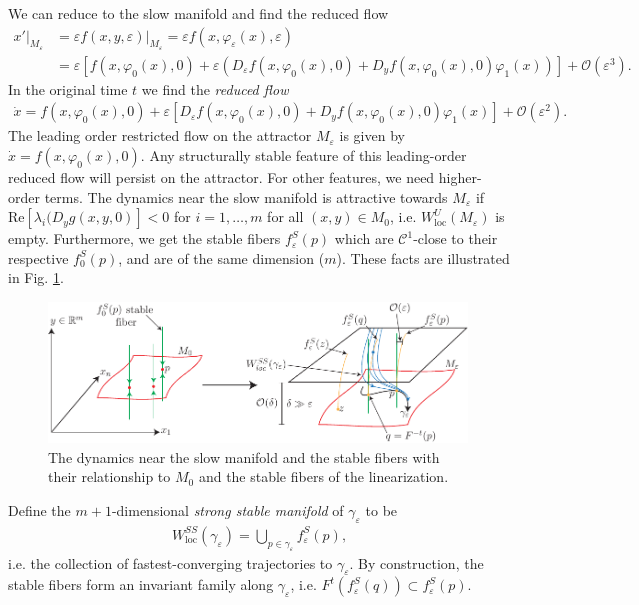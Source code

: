 We can reduce to the slow manifold and find the reduced flow
\begin{align}
	\left. x' \right|_{M_{\varepsilon}} &= \varepsilon\left. f(x,y, \varepsilon)\right|_{M_{\varepsilon }}	= \varepsilon f(x, \varphi_\varepsilon(x), \varepsilon) \\
					    &= \varepsilon \left[ f(x, \varphi_0 (x) , 0) + \varepsilon\left( D_{\varepsilon} f(x, \varphi_0(x), 0) + D_{y}f(x, \varphi_0 (x), 0) \varphi_1(x) \right) \right] + \mathcal{O}(\varepsilon ^{3}).
\end{align}
In the original time $t$ we find the \emph{reduced flow}
\begin{align}
	\boxed{
		\dot{x} = f(x, \varphi_0(x), 0) + \varepsilon \left[ D_{\varepsilon}f(x, \varphi_0(x), 0) + D_{y} f(x, \varphi_0(x), 0) \varphi_1(x) \right] + \mathcal{O}(\varepsilon^{2}).
	}
\end{align}
The leading order restricted flow on the attractor $M_{\varepsilon}$ is given by $\dot{x} = f(x, \varphi_0(x), 0)$. Any structurally stable feature of this leading-order reduced flow will persist on the attractor. For other features, we need higher-order terms. The dynamics near the slow manifold is attractive towards $M_{\varepsilon}$ if $ \textrm{Re} [\lambda_i ( D_{y}g(x,y,0)]<0$ for $i=1, \ldots, m$ for all $(x,y) \in M_0$, i.e. $W^{U}_{ \textrm{loc} }(M_{\varepsilon})$ is empty. Furthermore, we get the stable fibers $f_{\varepsilon}^{S}(p)$ which are $\mathcal{C}^{1}$-close to their respective $f_{0}^{S}(p)$, and are of the same dimension ($m$). These facts are illustrated in Fig. \ref{fig:perturbed_features}.

\begin{figure}[h!]
	\centering
	\includegraphics[width=0.99\textwidth]{figures/ch9/19perturbed_features.pdf}
	\caption{The dynamics near the slow manifold and the stable fibers with their relationship to $M_0$ and the stable fibers of the linearization.}
	\label{fig:perturbed_features}
\end{figure}

Define the $m+1$-dimensional \emph{strong stable manifold} of $\gamma_{\varepsilon}$ to be
\begin{align}
	W_{ \textrm{loc} }^{SS}(\gamma_{\varepsilon}) = \bigcup_{p \in \gamma_{\varepsilon}}f_{\varepsilon}^{S}(p),
\end{align}
i.e. the collection of fastest-converging trajectories to $\gamma_\varepsilon$. By construction, the stable fibers form an invariant family along $\gamma_{\varepsilon}$, i.e. $F^{t}(f^{S}_{\varepsilon}(q)) \subset f^{S}_{\varepsilon}(p)$.

